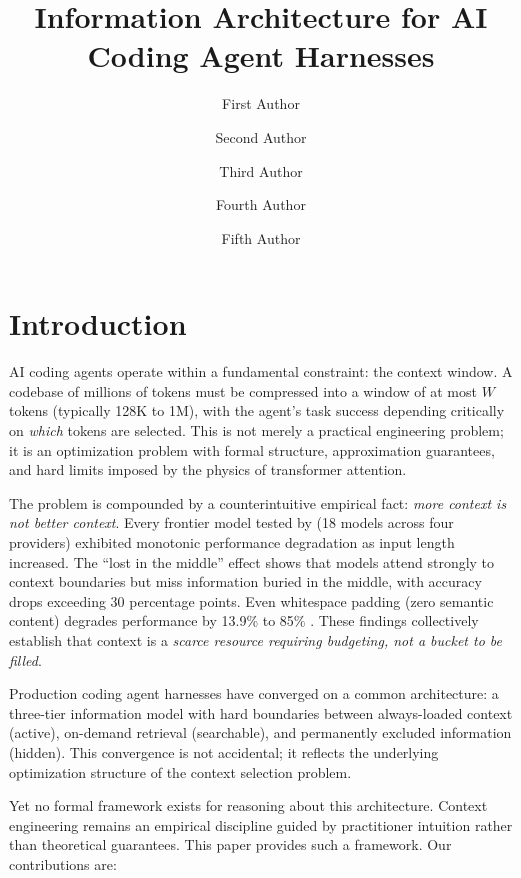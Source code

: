 \documentclass[11pt, a4paper, copyright]{googledeepmind}
\title{Information Architecture for AI Coding Agent Harnesses}
\author[1]{First Author}
\author[2]{Second Author}
\author[2]{Third Author}
\author[1]{Fourth Author}
\author[1]{Fifth Author}
\affil[*]{Equal Contribution}
\affil[1]{Affiliation 1}
\affil[2]{Affiliation 2}
\begin{document}
\maketitle

\section{Introduction}
\label{sec:introduction}

AI coding agents operate within a fundamental constraint: the context window. A codebase of millions of tokens must be compressed into a window of at most $W$ tokens (typically 128K to 1M), with the agent's task success depending critically on \emph{which} tokens are selected. This is not merely a practical engineering problem; it is an optimization problem with formal structure, approximation guarantees, and hard limits imposed by the physics of transformer attention.

The problem is compounded by a counterintuitive empirical fact: \emph{more context is not better context}. Every frontier model tested by \citet{chroma2025contextrot} (18 models across four providers) exhibited monotonic performance degradation as input length increased. The ``lost in the middle'' effect \citep{liu2024lost} shows that models attend strongly to context boundaries but miss information buried in the middle, with accuracy drops exceeding 30 percentage points. Even whitespace padding (zero semantic content) degrades performance by 13.9\% to 85\% \citep{du2025context}. These findings collectively establish that context is a \emph{scarce resource requiring budgeting, not a bucket to be filled}.

Production coding agent harnesses have converged on a common architecture: a three-tier information model with hard boundaries between always-loaded context (active), on-demand retrieval (searchable), and permanently excluded information (hidden). This convergence is not accidental; it reflects the underlying optimization structure of the context selection problem.

Yet no formal framework exists for reasoning about this architecture. Context engineering remains an empirical discipline guided by practitioner intuition rather than theoretical guarantees. This paper provides such a framework. Our contributions are:
\end{document}
